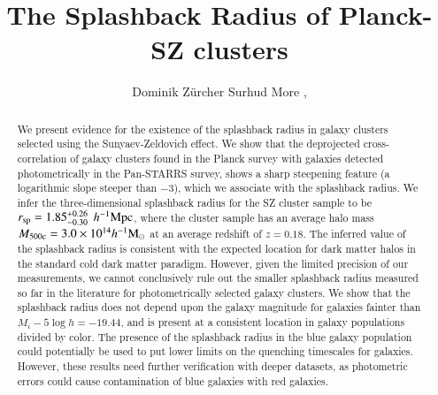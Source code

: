 \documentclass[iop, apjl, twocolappendix, numberedappendix]{emulateapj}
\def\mpch{h^{-1}{\rm Mpc}}
\def\msunh{h^{-1}{\rm M_{\odot}}}
\begin{document}
\title{The Splashback Radius of Planck-SZ clusters}

\author{
Dominik Zürcher 
Surhud More , 
}

\begin{abstract}
We present evidence for the existence of the splashback radius
in galaxy clusters selected using the Sunyaev-Zeldovich effect.
We show that the deprojected cross-correlation of galaxy clusters
found in the Planck survey with galaxies detected photometrically in
the Pan-STARRS survey, shows a sharp steepening feature (a
logarithmic slope steeper than $-3$), which we associate with the
splashback radius.  We infer the three-dimensional splashback radius
for the SZ cluster sample to be $r_{\rm sp}=1.85_{-0.30}^{+0.26}$ $\mpch$,
where the cluster sample has an average halo mass $M_{\rm
500c}=3.0\times10^{14}\msunh$ at an average redshift of $z=0.18$.
The inferred value of the splashback radius is consistent with the
expected location for dark matter halos in the standard cold dark
matter paradigm. However, given the limited precision of our
measurements, we cannot conclusively rule out the smaller splashback
radius measured so far in the literature for photometrically
selected galaxy clusters. We show that the splashback radius does
not depend upon the galaxy magnitude for galaxies fainter than
$M_i-5\log h=-19.44$, and is present at a consistent location in
galaxy populations divided by color. The presence of the splashback radius in
the blue galaxy population could potentially be used to put lower limits on the
quenching timescales for galaxies. However, these results need further
verification with deeper datasets, as photometric errors could cause
contamination of blue galaxies with red galaxies.

\end{abstract}

\end{document}
